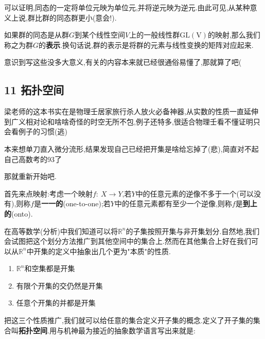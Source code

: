 \documentclass[UTF8]{article}
\begin{document}
	可以证明,同态的一定将单位元映为单位元,并将逆元映为逆元.由此可见,从某种意义上说,群比群的同态群更小(意会!).
	
	如果群的同态是从群$G$到某个线性空间$V$上的一般线性群$\mathrm{GL(V)}$的映射,那么我们称之为群$G$的\textbf{表示}.换句话说,群的表示是将群的元素与线性变换的矩阵对应起来.
	
	意识到写这些没多大意义,有关的内容本来就已经很通俗易懂了,那就算了吧(
	
	\newpage
	
	
	
	
	
	
	
\subsection*{11 拓扑空间\cite{LiangKunMiao}}
	
	梁老师的这本书实在是物理壬居家旅行杀人放火必备神器,从实数的性质一直延伸到广义相对论和啥啥奇怪的时空无所不包,例子还特多,很适合物理壬看不懂证明只会看例子的习惯(逃)
	
	本来想单刀直入微分流形,结果发现自己已经把开集是啥给忘掉了(悲),简直对不起自己高数考的93了
	
	那就重新开始吧.
	
	首先来点映射:考虑一个映射$f:~X\to Y$,若$Y$中的任意元素的逆像不多于一个(可以没有),则称$f$是\textbf{一一的}(one-to-one);若$Y$中的任意元素都有至少一个逆像,则称$f$是\textbf{到上的}(onto).
	
	在高等数学(分析)中我们知道可以将$\mathbb{R}^n$的子集按照开集与非开集划分.自然地,我们会试图把这个划分方法推广到其他空间中的集合上.然而在其他集合上好在我们可以从$\mathbb{R}^n$中开集的定义中抽象出几个更为"本质"的性质.
	
	\begin{enumerate}
		\item $\mathbb{R}^n$和空集都是开集
		\item 有限个开集的交仍然是开集
		\item 任意个开集的并都是开集
	\end{enumerate}
	
	把这三个性质推广,我们就可以给任意的集合定义开子集的概念.定义了开子集的集合叫\textbf{拓扑空间}.用与机神最为接近的抽象数学语言写出来就是:
	
	\newtheorem*{topology}{定义}
	
\end{document}

